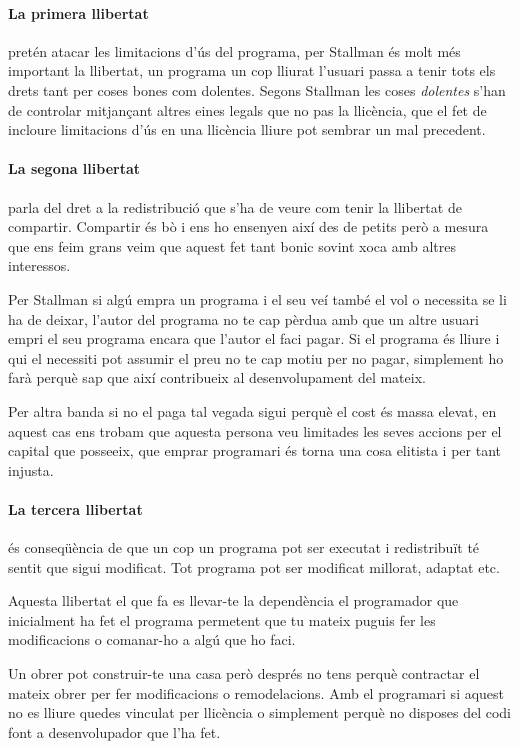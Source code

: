 \documentclass[a4paper,10pt]{scrartcl}
\begin{document}
\paragraph{La primera llibertat} pretén atacar les limitacions d'ús del programa,
per Stallman és molt més important la llibertat, un programa
un cop lliurat l'usuari passa a tenir tots els drets tant per coses
bones com dolentes. Segons Stallman les coses \emph{dolentes}
s'han de controlar mitjançant altres eines legals que no pas la llicència,
que el fet de incloure limitacions d'ús en una llicència lliure
pot sembrar un mal precedent.

\paragraph{La segona llibertat} parla del dret a la redistribució
que s'ha de veure com tenir la llibertat de compartir. Compartir és bò
i ens ho ensenyen així des de petits però a mesura que ens feim grans
veim que aquest fet tant bonic sovint xoca amb altres interessos.

Per Stallman si algú empra un programa i el seu veí també el vol
o necessita se li ha de deixar, l'autor del programa no te cap pèrdua
amb que un altre usuari empri el seu programa encara que l'autor
el faci pagar. Si el programa és lliure i qui el necessiti pot
assumir el preu no te cap motiu per no pagar, simplement ho farà
perquè sap que així contribueix al desenvolupament del mateix.

Per altra banda si no el paga tal vegada sigui perquè el cost
és massa elevat, en aquest cas ens trobam que aquesta persona
veu limitades les seves accions per el capital que posseeix,
que emprar programari és torna una cosa elitista i per tant injusta.

\paragraph{La tercera llibertat} és conseqüència de que
un cop un programa pot ser executat i redistribuït té sentit que 
sigui modificat. Tot programa pot ser modificat millorat, adaptat
etc.

Aquesta llibertat el que fa es llevar-te la dependència el programador 
que inicialment ha fet el programa permetent que tu mateix puguis
fer les modificacions o comanar-ho a algú que ho faci.

Un obrer pot construir-te una casa però després no tens perquè contractar
el mateix obrer per fer modificacions o remodelacions. Amb el programari
si aquest no es lliure quedes vinculat per llicència o simplement
perquè no disposes del codi font a desenvolupador que l'ha fet.
\end{document}
